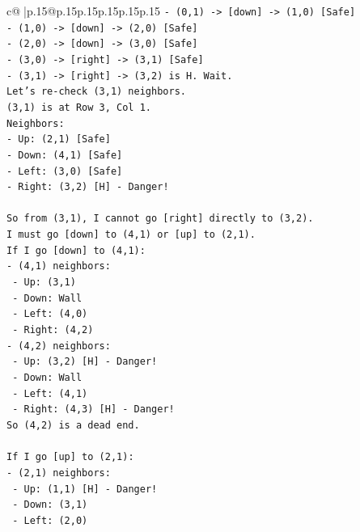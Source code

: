 \documentclass{article}
\begin{document}
{\begin{supertabular}{c@{$\;$}|p{.15\linewidth}@{}p{.15\linewidth}p{.15\linewidth}p{.15\linewidth}p{.15\linewidth}p{.15\linewidth}}
{{{\texttt{{-} (0,1) {-}> {[}down{]} {-}> (1,0) {[}Safe{]}} \\
\texttt{{-} (1,0) {-}> {[}down{]} {-}> (2,0) {[}Safe{]}} \\
\texttt{{-} (2,0) {-}> {[}down{]} {-}> (3,0) {[}Safe{]}} \\
\texttt{{-} (3,0) {-}> {[}right{]} {-}> (3,1) {[}Safe{]}} \\
\texttt{{-} (3,1) {-}> {[}right{]} {-}> (3,2) is H. Wait.} \\
\texttt{Let's re{-}check (3,1) neighbors.} \\
\texttt{(3,1) is at Row 3, Col 1.} \\
\texttt{Neighbors:} \\
\texttt{{-} Up: (2,1) {[}Safe{]}} \\
\texttt{{-} Down: (4,1) {[}Safe{]}} \\
\texttt{{-} Left: (3,0) {[}Safe{]}} \\
\texttt{{-} Right: (3,2) {[}H{]} {-} Danger!} \\
\\ 
\texttt{So from (3,1), I cannot go {[}right{]} directly to (3,2).} \\
\texttt{I must go {[}down{]} to (4,1) or {[}up{]} to (2,1).} \\
\texttt{If I go {[}down{]} to (4,1):} \\
\texttt{{-} (4,1) neighbors:} \\
\texttt{  {-} Up: (3,1)} \\
\texttt{  {-} Down: Wall} \\
\texttt{  {-} Left: (4,0)} \\
\texttt{  {-} Right: (4,2)} \\
\texttt{{-} (4,2) neighbors:} \\
\texttt{  {-} Up: (3,2) {[}H{]} {-} Danger!} \\
\texttt{  {-} Down: Wall} \\
\texttt{  {-} Left: (4,1)} \\
\texttt{  {-} Right: (4,3) {[}H{]} {-} Danger!} \\
\texttt{So (4,2) is a dead end.} \\
\\ 
\texttt{If I go {[}up{]} to (2,1):} \\
\texttt{{-} (2,1) neighbors:} \\
\texttt{  {-} Up: (1,1) {[}H{]} {-} Danger!} \\
\texttt{  {-} Down: (3,1)} \\
\texttt{  {-} Left: (2,0)} \\
}}}
\end{supertabular}}
\end{document}

